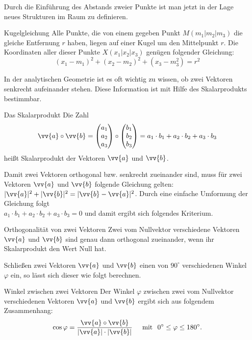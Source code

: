 Durch die Einführung des Abstands zweier Punkte ist man jetzt in der Lage neues Strukturen im Raum zu definieren. 
\begin{b8d}{Kugelgleichung}{}
Alle Punkte, die von einem gegeben Punkt $M(m_1|m_2|m_3)$ die gleiche Entfernung $r$ haben, liegen auf einer Kugel um den Mittelpunkt $r$. Die Koordinaten aller dieser Punkte $X(x_1|x_2|x_3)$ genügen folgender Gleichung: $$(x_1-m_1)^2 + (x_2 -m_2)^2 + (x_3 -m_3 ^2) = r^2$$
\end{b8d}
In der analytischen Geometrie ist es oft wichtig zu wissen, ob zwei Vektoren senkrecht aufeinander stehen. Diese Information ist mit Hilfe des Skalarprodukts bestimmbar.
\begin{merke}{Das Skalarprodukt}{}
Die Zahl $$\vv{a} \circ \vv{b} = \begin{pmatrix} a_1 \\a_2 \\a_3\end{pmatrix} \circ \begin{pmatrix} b_1 \\b_2 \\b_3\end{pmatrix} = a_1\cdot b_1 + a_2\cdot b_2 + a_3\cdot b_3$$ heißt Skalarprodukt der Vektoren $\vv{a}$ und $\vv{b}$. 
\end{merke}
Damit zwei Vektoren orthogonal bzw. senkrecht zueinander sind, muss für zwei Vektoren $\vv{a}$ und $\vv{b}$ folgende Gleichung gelten: $|\vv{a}|^2 + |\vv{b}|^2 = |\vv{b} -\vv{a}|^2$. Durch eine einfache Umformung der Gleichung folgt\\ $ a_1\cdot b_1 + a_2\cdot b_2 + a_3\cdot b_3 = 0$ und damit ergibt sich folgendes Kriterium.
\begin{b8d}{Orthogonalität von zwei Vektoren}{} 
Zwei vom Nullvektor verschiedene Vektoren $\vv{a}$ und $\vv{b}$ sind genau dann orthogonal zueinander, wenn ihr Skalarprodukt den Wert Null hat.
\end{b8d}
Schließen zwei Vektoren $\vv{a}$ und $\vv{b}$ einen von $90^{\circ}$ verschiedenen Winkel $\varphi$ ein, so lässt sich dieser wie folgt berechnen.
\begin{merke}{Winkel zwischen zwei Vektoren}{}
Der Winkel $\varphi$ zwischen zwei vom Nullvektor verschiedenen Vektoren $\vv{a}$ und $\vv{b}$ ergibt sich aus folgendem Zusammenhang: $$\cos{\varphi} = \dfrac{\vv{a} \circ \vv{b}}{|\vv{a}| \cdot |\vv{b}|}\hspace{0.5cm}\text{mit}\hspace{0.25cm} 0^{\circ} \leq \varphi \leq 180^{\circ}.$$  
\end{merke}
